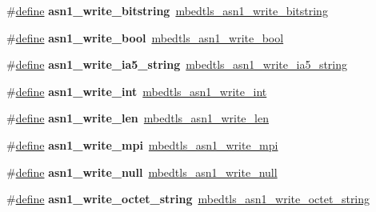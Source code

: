 \begin{DoxyCompactItemize}
\mbox{\label{compat-1_83_8h_a8f2c29b07da0fc888abcb02f819228d4}} 
\#\hyperlink{structdefine}{define} {\bfseries asn1\+\_\+write\+\_\+bitstring}~\hyperlink{asn1write_8h_a3198221d6169d22d72e6a166043f40c5}{mbedtls\+\_\+asn1\+\_\+write\+\_\+bitstring}
\item 
\mbox{\label{compat-1_83_8h_a2cc44d9f5be4e5bf4a2fb5e043c986da}} 
\#\hyperlink{structdefine}{define} {\bfseries asn1\+\_\+write\+\_\+bool}~\hyperlink{asn1write_8h_adfc6b0a6111a9fe9b586c2a931e3e205}{mbedtls\+\_\+asn1\+\_\+write\+\_\+bool}
\item 
\mbox{\label{compat-1_83_8h_aafe93b21c8bf73d69e40fa17afb0b745}} 
\#\hyperlink{structdefine}{define} {\bfseries asn1\+\_\+write\+\_\+ia5\+\_\+string}~\hyperlink{asn1write_8h_af3bfd68158c26618239a733986b11528}{mbedtls\+\_\+asn1\+\_\+write\+\_\+ia5\+\_\+string}
\item 
\mbox{\label{compat-1_83_8h_a6e22278f6ff0629a5cd1b7169588d171}} 
\#\hyperlink{structdefine}{define} {\bfseries asn1\+\_\+write\+\_\+int}~\hyperlink{asn1write_8h_a6c5e6e927a74d85aea15866fb50e63c8}{mbedtls\+\_\+asn1\+\_\+write\+\_\+int}
\item 
\mbox{\label{compat-1_83_8h_a30b7b8024c3d15291be012d07a224c4f}} 
\#\hyperlink{structdefine}{define} {\bfseries asn1\+\_\+write\+\_\+len}~\hyperlink{asn1write_8h_a7fe6f4cdba05081bff484a7b286108df}{mbedtls\+\_\+asn1\+\_\+write\+\_\+len}
\item 
\mbox{\label{compat-1_83_8h_ae8564c81ce773a6b5978e6baccb5c488}} 
\#\hyperlink{structdefine}{define} {\bfseries asn1\+\_\+write\+\_\+mpi}~\hyperlink{asn1write_8h_ac2639a2da5918931152dd1ee1a93e7c9}{mbedtls\+\_\+asn1\+\_\+write\+\_\+mpi}
\item 
\mbox{\label{compat-1_83_8h_ab56aa049f9173c3cafbaaa9984bd2206}} 
\#\hyperlink{structdefine}{define} {\bfseries asn1\+\_\+write\+\_\+null}~\hyperlink{asn1write_8h_adc9614b64c7bb92e1d159898b23acd90}{mbedtls\+\_\+asn1\+\_\+write\+\_\+null}
\item 
\mbox{\label{compat-1_83_8h_a6db330a3f5cadfd36a618fbddabbabb4}} 
\#\hyperlink{structdefine}{define} {\bfseries asn1\+\_\+write\+\_\+octet\+\_\+string}~\hyperlink{asn1write_8h_a56e71582d7ccef976c09c49f9370e81b}{mbedtls\+\_\+asn1\+\_\+write\+\_\+octet\+\_\+string}

\end{DoxyCompactItemize}
